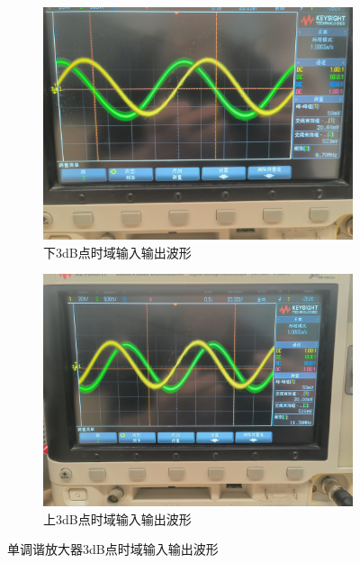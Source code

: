 \documentclass[UTF8]{ctexart}
\begin{document}
\begin{enumerate}[(1)]
    \begin{figure}[H]
        \centering
        \begin{subfigure}[c]{0.45\textwidth}
            \centering
            \includegraphics[width=\textwidth]{pics/3.2.2.png}
            \caption{下3dB点时域输入输出波形}\label{3.2.2}
        \end{subfigure}
        \begin{subfigure}[c]{0.45\textwidth}
            \centering
            \includegraphics[width=\textwidth]{pics/3.2.2(2).png}
            \caption{上3dB点时域输入输出波形}\label{3.2.2(2)}
        \end{subfigure}
        \caption{单调谐放大器3dB点时域输入输出波形}\label{fig:bi_harmo_amplifier}
    \end{figure}


\end{enumerate}
\end{document}

